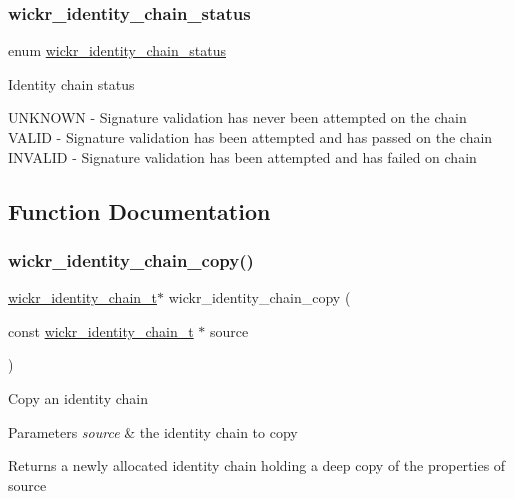 \subsubsection{\texorpdfstring{wickr\+\_\+identity\+\_\+chain\+\_\+status}{wickr\_identity\_chain\_status}}
{\footnotesize\ttfamily enum \hyperlink{group__wickr__identity_ga78aefa3835eb13ca75c0129583b5ebfa}{wickr\+\_\+identity\+\_\+chain\+\_\+status}}

Identity chain status

U\+N\+K\+N\+O\+WN -\/ Signature validation has never been attempted on the chain V\+A\+L\+ID -\/ Signature validation has been attempted and has passed on the chain I\+N\+V\+A\+L\+ID -\/ Signature validation has been attempted and has failed on chain 

\subsection{Function Documentation}
\mbox{\label{group__wickr__identity_gac9d708d340abcd0b54d87434b71d2d9e}} 
\subsubsection{\texorpdfstring{wickr\+\_\+identity\+\_\+chain\+\_\+copy()}{wickr\_identity\_chain\_copy()}}
{\footnotesize\ttfamily \hyperlink{structwickr__identity__chain}{wickr\+\_\+identity\+\_\+chain\+\_\+t}$\ast$ wickr\+\_\+identity\+\_\+chain\+\_\+copy (\begin{DoxyParamCaption}\item[{const \hyperlink{structwickr__identity__chain}{wickr\+\_\+identity\+\_\+chain\+\_\+t} $\ast$}]{source }\end{DoxyParamCaption})}

Copy an identity chain


\begin{DoxyParams}{Parameters}
{\em source} & the identity chain to copy \\
\hline
\end{DoxyParams}
\begin{DoxyReturn}{Returns}
a newly allocated identity chain holding a deep copy of the properties of \textquotesingle{}source\textquotesingle{} 
\end{DoxyReturn}
\mbox{\label{group__wickr__identity_ga79551385194ba6b044b676ce5c7400e6}} 
